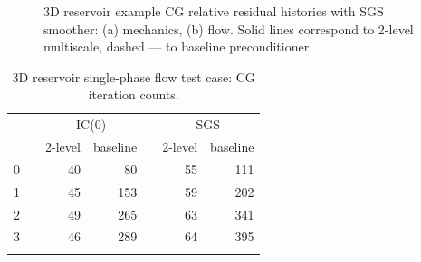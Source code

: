 \begin{figure} [htbp]
  \begin{subfigure}[t]{0.48\textwidth}
    \centering
    
    \caption{}
    \label{fig:mazumodel2_matlab_conv_mech}
  \end{subfigure}
  \hfill
  \begin{subfigure}[t]{0.48\textwidth}
    \centering
    
    \caption{}
    \label{fig:mazumodel2_matlab_conv_flow}
  \end{subfigure}
  \caption[3D reservoir example convergence histories]{3D reservoir example CG relative residual histories with SGS smoother: (a) mechanics, (b) flow.   Solid lines correspond to 2-level multiscale, dashed --- to baseline preconditioner.}
  \label{fig:mazumodel2_matlab_conv}
\end{figure}

\begin{table}
    \centering
    \caption{3D reservoir single-phase flow test case: CG iteration counts.}
    \label{tab:mazumodel2_matlab_conv_flow}
    \begin{tabular}{rrrrrrr}
        \hline\noalign{\smallskip}
        \multirow{2}{*}{$\ell$} & & \multicolumn{2}{c}{IC(0)} & & \multicolumn{2}{c}{SGS} \\
        \noalign{\smallskip}\cline{3-4} \cline{6-7}\noalign{\smallskip}
        & & 2-level & baseline & & 2-level & baseline \\
        \hline\noalign{\smallskip}
        0 & & 40 &  80 & & 55 & 111 \\
        1 & & 45 & 153 & & 59 & 202 \\
        2 & & 49 & 265 & & 63 & 341 \\
        3 & & 46 & 289 & & 64 & 395 \\
        \hline\noalign{\smallskip}
    \end{tabular}
\end{table}

